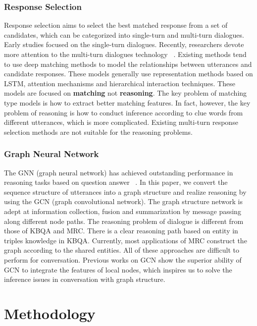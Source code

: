 \documentclass[letterpaper]{article} %
\begin{document}
\subsubsection{Response Selection}
Response selection aims to select the best matched response from a set of candidates, which can be categorized into single-turn and multi-turn dialogues. Early studies focused on the single-turn dialogues. Recently, researchers devote more attention to the multi-turn dialogues technology ~\cite{Tao2019,Tao2020,Lu2020}. Existing methods tend to use deep matching methods to model the relationships between utterances and candidate responses. These models generally use representation methods based on LSTM, attention mechanisms and hierarchical interaction techniques. These models are focused on \textbf{matching} not \textbf{reasoning}. The key problem of matching type models is how to extract better matching features.  In fact, however, the key problem of reasoning is how to conduct inference according to clue words from different utterances, which is more complicated. Existing multi-turn response selection methods are not suitable for the reasoning problems.
\subsubsection{Graph Neural Network}
The GNN (graph neural network) has achieved outstanding performance in reasoning tasks based on question answer ~\cite{Qiu2020}. In this paper, we convert the sequence structure of utterances into a graph structure and realize reasoning by using the GCN (graph convolutional network). The graph structure network is adept at information collection, fusion and summarization by message passing along different node paths. The reasoning problem of dialogue is different from those of KBQA and MRC. There is a clear reasoning path based on entity in triples knowledge in KBQA. Currently, most applications of MRC construct the graph according to the shared entities. All of these approaches are difficult to perform for conversation. Previous works on GCN show the superior ability of GCN to integrate the features of local nodes, which inspires us to solve the inference issues in conversation with graph structure.
\section{Methodology}
\end{document}

